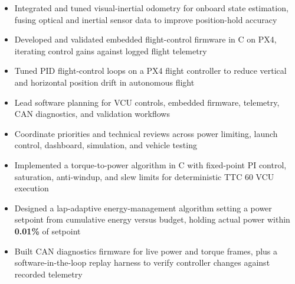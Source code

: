 \documentclass[10pt,letterpaper]{article}
\begin{document}
\bodyfont

\resumeheader
\educationsection




\begin{itemize}
  \item Integrated and tuned visual-inertial odometry for onboard state estimation, fusing optical and inertial sensor data to improve position-hold accuracy
  \item Developed and validated embedded flight-control firmware in C on PX4, iterating control gains against logged flight telemetry
  \item Tuned PID flight-control loops on a PX4 flight controller to reduce vertical and horizontal position drift in autonomous flight
\end{itemize}

\entryspace

\orgline{\spartanracing}
\begin{itemize}
  \item Lead software planning for VCU controls, embedded firmware, telemetry, CAN diagnostics, and validation workflows
  \item Coordinate priorities and technical reviews across power limiting, launch control, dashboard, simulation, and vehicle testing
\end{itemize}

\entryspace

\orgline{\spartanracing}
\begin{itemize}
  \item Implemented a torque-to-power algorithm in C with fixed-point PI control, saturation, anti-windup, and slew limits for deterministic TTC 60 VCU execution
  \item Designed a lap-adaptive energy-management algorithm setting a power setpoint from cumulative energy versus budget, holding actual power within \textbf{0.01\%} of setpoint
  \item Built CAN diagnostics firmware for live power and torque frames, plus a software-in-the-loop replay harness to verify controller changes against recorded telemetry
\end{itemize}
\end{document}
